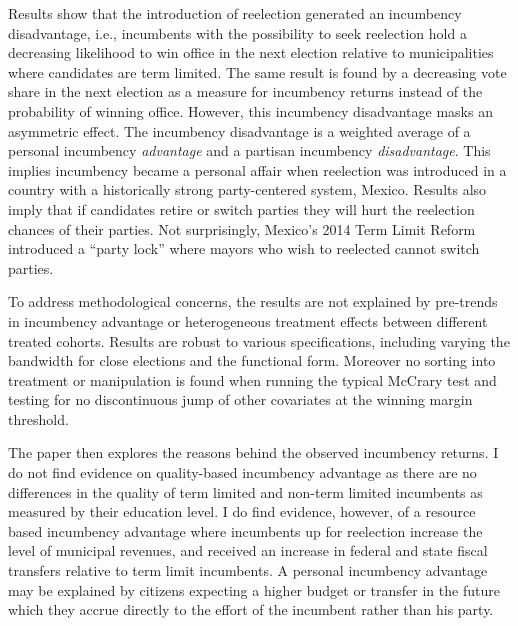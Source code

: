 \documentclass[12pt]{amsart}
\numberwithin{equation}{section}
\theoremstyle{definition}
\theoremstyle{definition}
\theoremstyle{definition}
\begin{document}
Results show that the introduction of reelection generated an incumbency disadvantage, i.e., incumbents with the possibility to seek reelection hold a decreasing likelihood to win office in the next election relative to municipalities where candidates are term limited. The same result is found by a decreasing vote share in the next election as a measure for incumbency returns instead of the probability of winning office. However, this incumbency disadvantage masks an asymmetric effect. The incumbency disadvantage is a weighted average of a personal incumbency \emph{advantage} and a partisan incumbency \emph{disadvantage}. This implies incumbency became a personal affair when reelection was introduced in a country with a historically strong party-centered system, Mexico. Results also imply that if candidates retire or switch parties they will hurt the reelection chances of their parties. Not surprisingly, Mexico's 2014 Term Limit Reform introduced a ``party lock'' where mayors who wish to reelected cannot switch parties.  

To address  methodological concerns, the results are not explained by pre-trends in incumbency advantage or heterogeneous treatment effects between different treated cohorts. Results are robust to various specifications, including varying the bandwidth for close elections and the functional form. Moreover no sorting into treatment or manipulation is found when running the typical McCrary test and testing for no discontinuous jump of other covariates at the winning margin threshold. 

The paper then explores the reasons behind the observed incumbency returns. I do not find evidence on quality-based incumbency advantage as there are no differences in the quality of term limited and non-term limited incumbents as measured by their education level. I do find evidence, however, of a resource based incumbency advantage where incumbents up for reelection increase the level of municipal revenues, and received an increase in federal and state fiscal transfers relative to term limit incumbents. A personal incumbency advantage may be explained by citizens expecting a higher budget or transfer in the future which they accrue directly to the effort of the incumbent rather than his party. %
\end{document}
